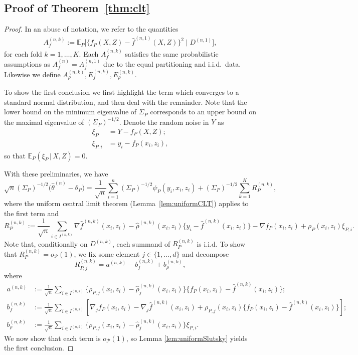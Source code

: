 \documentclass[aos]{imsart}
\newcommand{\E}{\mathbb{E}}
\newcommand{\given}{\,|\,}
\begin{document}
	\subsection{Proof of Theorem~\ref{thm:clt}}
	\begin{proof}
		In an abuse of notation, we refer to the quantities \begin{align*}
			A_f^{(n,k)} := \E_P \big[\{f_P(X,Z)-\hat f^{(n,1)}(X,Z)\}^2 \; \big| \; D^{(n,1)}\big],
		\end{align*} for each fold $k=1,\ldots,K$. Each $A_f^{(n,k)}$ satisfies the same probabilistic assumptions as $A_f^{(n)} = A_f^{(n,1)}$ due to the equal partitioning and i.i.d.\ data. Likewise we define $A_\rho^{(n,k)}, E_f^{(n,k)}, E_\rho^{(n,k)}$.
		
		To show the first conclusion we first highlight the term which converges to a standard normal distribution, and then deal with the remainder. Note that the lower bound on the minimum eigenvalue of $\Sigma_P$ corresponds to an upper bound on the maximal eigenvalue of $(\Sigma_P)^{-1/2}$. Denote the random noise in $Y$ as\begin{align*}
			\xi_P &= Y - f_P(X,Z);\\
			\xi_{P,i} &= y_i - f_P(x_i, z_i),
		\end{align*}
		so that $\E_P(\xi_P\given  X,Z) = 0$.
		
		With these preliminaries, we have
		\begin{equation*}
			\sqrt{n}(\Sigma_P)^{-1/2}\Big(\hat\theta^{(n)}-\theta_P\Big) = \frac{1}{\sqrt{n}}\sum_{i=1}^n (\Sigma_P)^{-1/2} \psi_P(y_i,x_i,z_i) + (\Sigma_P)^{-1/2} \sum_{k=1}^K R_P^{(n,k)},
		\end{equation*} where the uniform central limit theorem (Lemma~\ref{lem:uniformCLT}) applies to the first term and \begin{equation*}
			R_P^{(n,k)} := \frac{1}{\sqrt{n}} \sum_{i\in I^{(n,k)}}  \nabla \hat f^{(n,k)}(x_i,z_i) - \hat\rho^{(n,k)}(x_i,z_i) \{y_i-\hat f^{(n,k)}(x_i,z_i)\}  - \nabla f_P(x_i,z_i) + \rho_P(x_i,z_i)\xi_{P,i}.
		\end{equation*}
		Note that, conditionally on $D^{(n,k)}$, each summand of $R_P^{(n,k)}$ is i.i.d. To show that $R_P^{(n,k)}=o_{\mathcal{P}}(1)$, we fix some element $j\in\{1,\ldots, d\}$ and decompose \begin{equation}
			\label{eqn:psidecomposition}
			R_{P,j}^{(n,k)} = a^{(n,k)} - b_f^{(n,k)} + b_\rho^{(n,k)},
		\end{equation}
		where
		\begin{align*}
			a^{(n,k)}&:= \frac{1}{\sqrt{n}} \sum_{i\in I^{(n,k)}} \{\rho_{P,j}(x_i,z_i)-\hat\rho_j^{(n,k)}(x_i,z_i)\}\{f_P(x_i,z_i)-\hat f^{(n,k)}(x_i,z_i)\};\\
			b_f^{(n,k)}&:= \frac{1}{\sqrt{n}} \sum_{i\in I^{(n,k)}} [\nabla_j f_P(x_i,z_i)-\nabla_j \hat f^{(n,k)}(x_i,z_i) +\rho_{P,j}(x_i,z_i)\{f_P(x_i,z_i)-\hat f^{(n,k)}(x_i,z_i)\}];\\
			b_\rho^{(n,k)}&:= \frac{1}{\sqrt{n}} \sum_{i\in I^{(n,k)}} \{\rho_{P,j}(x_i,z_i)-\hat\rho_j^{(n,k)}(x_i,z_i)\} \xi_{P,i}.
		\end{align*}
		We now show that each term is $o_\mathcal{P}(1)$, so Lemma \ref{lem:uniformSlutsky} yields the first conclusion.
		

\end{proof}
\end{document}
